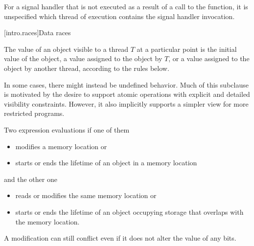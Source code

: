 \pnum
For a signal handler that is not executed as a result of a call to the
 function, it is unspecified which thread of execution
contains the signal handler invocation.

[intro.races]{Data races}

\pnum
The value of an object visible to a thread $T$ at a particular point is the
initial value of the object, a value assigned to the object by $T$, or a
value assigned to the object by another thread, according to the rules below.
\begin{note}
In some cases, there might instead be undefined behavior. Much of this
subclause is motivated by the desire to support atomic operations with explicit
and detailed visibility constraints. However, it also implicitly supports a
simpler view for more restricted programs.
\end{note}

\pnum
Two expression evaluations  if one of them
\begin{itemize}
\item
modifies a memory location or
\item
starts or ends the lifetime of an object in a memory location
\end{itemize}
and the other one
\begin{itemize}
\item
reads or modifies the same memory location or
\item
starts or ends the lifetime of an object occupying storage that
overlaps with the memory location.
\end{itemize}
\begin{note}
A modification can still conflict
even if it does not alter the value of any bits.
\end{note}

